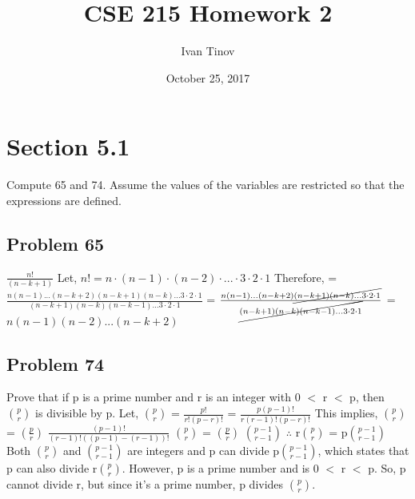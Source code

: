 \documentclass{article}
\title{CSE 215 Homework 2}
\author{Ivan Tinov}
\date{October 25, 2017}
\begin{document}
	
	\maketitle
	
	\section*{Section 5.1}
	Compute 65 and 74. Assume the values of the variables are
	restricted so that the expressions are defined.
	
	\subsection*{Problem 65}
	$\frac{n!}{(n-k+1)}$ 
	\newline
	Let, $n! = n\cdot(n-1)\cdot(n-2)\cdot...\cdot3\cdot2\cdot1$
	\newline
	Therefore,
	\newline
	= $\frac{n(n-1)...(n-k+2)(n-k+1)(n-k)...3\cdot2\cdot1}{(n-k+1)(n-k)(n-k-1)...3\cdot2\cdot1}$
	\newline
	= $\frac{n(n-1)...(n-k+2)\cancel{(n-k+1)(n-k)...3\cdot2\cdot1}}{\cancel{(n-k+1)(n-k)(n-k-1)...3\cdot2\cdot1}}$
	\newline
	\newline
	= $n(n-1)(n-2)...(n-k+2)$
	
	
	\subsection*{Problem 74}
	Prove that if p is a prime number and r is an integer with 0 $<$ r $<$ p, then ${p}\choose{r}$ is divisible by p.
	\newline
	Let, ${p}\choose{r}$ = $\frac{p!}{r!(p-r)!}$
	\newline
	= $\frac{p(p-1)!}{r(r-1)!(p-r)!}$
	\newline
	This implies, ${p}\choose{r}$ = $(\frac{p}{r})$ $\frac{(p-1)!}{(r-1)!((p-1)-(r-1))!}$
	\newline
	${p}\choose{r}$ = $(\frac{p}{r})$ ${p-1}\choose{r-1}$
	\newline
	$\therefore$ r${p}\choose{r}$ = p${p-1}\choose{r-1}$
	\newline
	Both ${p}\choose{r}$ and ${p-1}\choose{r-1}$ are integers and p can divide p${p-1}\choose{r-1}$, which states that p can also divide r${p}\choose{r}$.
	\newline
	However, p is a prime number and is 0 $<$ r $<$ p. So, p cannot divide r, but since it's a prime number, p divides ${p}\choose{r}$. 
	
\end{document}
